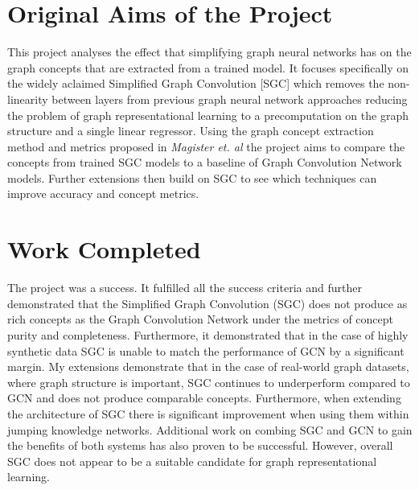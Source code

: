 \documentclass[12pt,a4paper,twoside,openright]{report}
\begin{document}


\section*{Original Aims of the Project}


This project analyses the effect that simplifying graph neural networks has on the graph concepts that are extracted from a trained model.
It focuses specifically on the widely aclaimed Simplified Graph Convolution \cite{wu2019simplifying}[SGC] which removes the non-linearity between layers from previous graph neural network approaches reducing the problem of graph representational learning to a precomputation on the graph structure and a single linear regressor.
Using the graph concept extraction method and metrics proposed in \textit{Magister et. al} \cite{magister2021gcexplainer} the project aims to compare the concepts from trained SGC models to a baseline of Graph Convolution Network models.
Further extensions then build on SGC to see which techniques can improve accuracy and concept metrics.

\section*{Work Completed}

The project was a success. 
It fulfilled all the success criteria and further demonstrated that the Simplified Graph Convolution (SGC) does not produce as rich concepts as the Graph Convolution Network under the metrics of concept purity and completeness. 
Furthermore, it demonstrated that in the case of highly synthetic data SGC is unable to match the performance of GCN by a significant margin. 
My extensions demonstrate that in the case of real-world graph datasets, where graph structure is important, SGC continues to underperform compared to GCN and does not produce comparable concepts.
Furthermore, when extending the architecture of SGC there is significant improvement when using them within jumping knowledge networks\cite{xu2018representation}.
Additional work on combing SGC and GCN to gain the benefits of both systems has also proven to be successful.
However, overall SGC does not appear to be a suitable candidate for graph representational learning.
\end{document}
